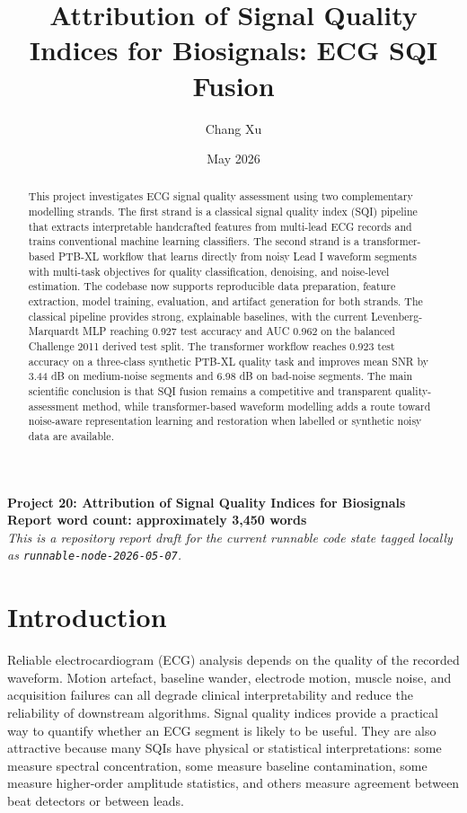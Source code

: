\documentclass[11pt,a4paper]{article}
\title{Attribution of Signal Quality Indices for Biosignals: ECG SQI Fusion}
\author{Chang Xu}
\date{May 2026}
\begin{document}
\maketitle

\begin{center}
\textbf{Project 20: Attribution of Signal Quality Indices for Biosignals}\\
\textbf{Report word count: approximately 3,450 words}\\
\textit{This is a repository report draft for the current runnable code state tagged locally as \texttt{runnable-node-2026-05-07}.}
\end{center}

\begin{abstract}
This project investigates ECG signal quality assessment using two complementary modelling strands. The first strand is a classical signal quality index (SQI) pipeline that extracts interpretable handcrafted features from multi-lead ECG records and trains conventional machine learning classifiers. The second strand is a transformer-based PTB-XL workflow that learns directly from noisy Lead I waveform segments with multi-task objectives for quality classification, denoising, and noise-level estimation. The codebase now supports reproducible data preparation, feature extraction, model training, evaluation, and artifact generation for both strands. The classical pipeline provides strong, explainable baselines, with the current Levenberg-Marquardt MLP reaching 0.927 test accuracy and AUC 0.962 on the balanced Challenge 2011 derived test split. The transformer workflow reaches 0.923 test accuracy on a three-class synthetic PTB-XL quality task and improves mean SNR by 3.44 dB on medium-noise segments and 6.98 dB on bad-noise segments. The main scientific conclusion is that SQI fusion remains a competitive and transparent quality-assessment method, while transformer-based waveform modelling adds a route toward noise-aware representation learning and restoration when labelled or synthetic noisy data are available.
\end{abstract}

\section{Introduction}

Reliable electrocardiogram (ECG) analysis depends on the quality of the recorded waveform. Motion artefact, baseline wander, electrode motion, muscle noise, and acquisition failures can all degrade clinical interpretability and reduce the reliability of downstream algorithms. Signal quality indices provide a practical way to quantify whether an ECG segment is likely to be useful. They are also attractive because many SQIs have physical or statistical interpretations: some measure spectral concentration, some measure baseline contamination, some measure higher-order amplitude statistics, and others measure agreement between beat detectors or between leads.
\end{document}
